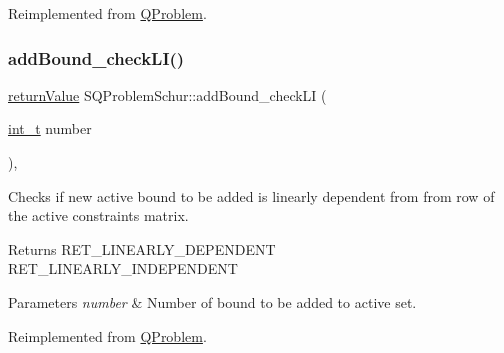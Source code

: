 Reimplemented from \hyperlink{class_q_problem_a75f15b703d47a494398eaa28cd2438e5}{Q\+Problem}.

\mbox{\label{class_s_q_problem_schur_af60b7a8cfc76b04bb1541df32cc99272}} 
\subsubsection{\texorpdfstring{add\+Bound\+\_\+check\+L\+I()}{addBound\_checkLI()}}
{\footnotesize\ttfamily \hyperlink{_message_handling_8hpp_a81d556f613bfbabd0b1f9488c0fa865e}{return\+Value} S\+Q\+Problem\+Schur\+::add\+Bound\+\_\+check\+LI (\begin{DoxyParamCaption}\item[{\hyperlink{_types_8hpp_ab6fd6105e64ed14a0c9281326f05e623}{int\+\_\+t}}]{number }\end{DoxyParamCaption})\hspace{0.3cm}{\ttfamily [protected]}, {\ttfamily [virtual]}}

Checks if new active bound to be added is linearly dependent from from row of the active constraints matrix. \begin{DoxyReturn}{Returns}
R\+E\+T\+\_\+\+L\+I\+N\+E\+A\+R\+L\+Y\+\_\+\+D\+E\+P\+E\+N\+D\+E\+NT ~\newline
 R\+E\+T\+\_\+\+L\+I\+N\+E\+A\+R\+L\+Y\+\_\+\+I\+N\+D\+E\+P\+E\+N\+D\+E\+NT 
\end{DoxyReturn}

\begin{DoxyParams}{Parameters}
{\em number} & Number of bound to be added to active set. \\
\hline
\end{DoxyParams}


Reimplemented from \hyperlink{class_q_problem_a7ffc401c784522506e76db1c5e4ea305}{Q\+Problem}.

\mbox{\label{class_s_q_problem_schur_a2f4c039379bf3762dba1435f0beedd3b}} 
